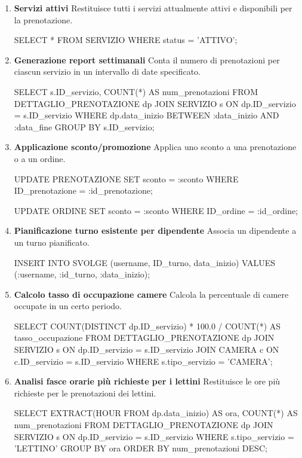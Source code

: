 \documentclass[a4paper,12pt]{report}
\begin{document}
\begin{enumerate}[label=\textbf{\arabic*.}]
	\item \textbf{Servizi attivi} \newline
	      Restituisce tutti i servizi attualmente attivi e disponibili per la prenotazione.
\begin{sqlcode}
SELECT *
FROM SERVIZIO
WHERE status = 'ATTIVO';
\end{sqlcode}

	\item \textbf{Generazione report settimanali} \newline
	      Conta il numero di prenotazioni per ciascun servizio in un intervallo di date specificato.
\begin{sqlcode}
SELECT s.ID_servizio, COUNT(*) AS num_prenotazioni
FROM DETTAGLIO_PRENOTAZIONE dp
JOIN SERVIZIO s ON dp.ID_servizio = s.ID_servizio
WHERE dp.data_inizio BETWEEN :data_inizio AND :data_fine
GROUP BY s.ID_servizio;
\end{sqlcode}

	\item \textbf{Applicazione sconto/promozione} \newline
	      Applica uno sconto a una prenotazione o a un ordine.
\begin{sqlcode}
UPDATE PRENOTAZIONE
SET sconto = :sconto
WHERE ID_prenotazione = :id_prenotazione;

UPDATE ORDINE
SET sconto = :sconto
WHERE ID_ordine = :id_ordine;
\end{sqlcode}

	\item \textbf{Pianificazione turno esistente per dipendente} \newline
	      Associa un dipendente a un turno pianificato.
\begin{sqlcode}
INSERT INTO SVOLGE (username, ID_turno, data_inizio)
VALUES (:username, :id_turno, :data_inizio);
\end{sqlcode}

	\item \textbf{Calcolo tasso di occupazione camere} \newline
	      Calcola la percentuale di camere occupate in un certo periodo.
\begin{sqlcode}
SELECT COUNT(DISTINCT dp.ID_servizio) * 100.0 / COUNT(*) AS tasso_occupazione
FROM DETTAGLIO_PRENOTAZIONE dp
JOIN SERVIZIO s ON dp.ID_servizio = s.ID_servizio
JOIN CAMERA c ON c.ID_servizio = s.ID_servizio
WHERE s.tipo_servizio = 'CAMERA';
\end{sqlcode}

	      \newpage
	\item \textbf{Analisi fasce orarie più richieste per i lettini} \newline
	      Restituisce le ore più richieste per le prenotazioni dei lettini.
\begin{sqlcode}
SELECT EXTRACT(HOUR FROM dp.data_inizio) AS ora, COUNT(*) AS num_prenotazioni
FROM DETTAGLIO_PRENOTAZIONE dp
JOIN SERVIZIO s ON dp.ID_servizio = s.ID_servizio
WHERE s.tipo_servizio = 'LETTINO'
GROUP BY ora
ORDER BY num_prenotazioni DESC;
\end{sqlcode}


\end{enumerate}
\end{document}
